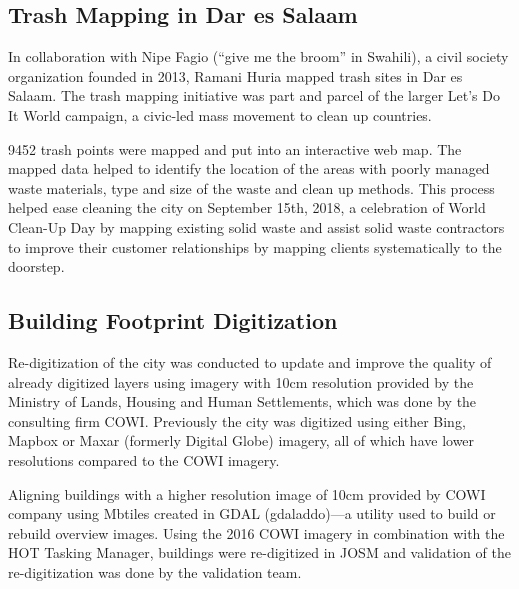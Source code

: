 \documentclass[a4paper,12pt,twoside]{article}
\begin{document}
\subsection{Trash Mapping in Dar es Salaam}
\begin{multicols}{2}
In collaboration with Nipe Fagio (“give me the broom” in Swahili), a civil society organization founded in 2013, Ramani Huria mapped trash sites in Dar es Salaam. The trash mapping initiative was part and parcel of the larger Let’s Do It World campaign, a civic-led mass movement to clean up countries.

9452 trash points were mapped and put into an interactive web map. The mapped data helped to identify the location of the areas with poorly managed waste materials, type and size of the waste and clean up methods. This process helped ease cleaning the city on September 15th, 2018, a celebration of World Clean-Up Day by mapping existing solid waste and assist solid waste contractors to improve their customer relationships by mapping clients systematically to the doorstep.
\end{multicols}

\subsection{Building Footprint Digitization}
\begin{multicols}{2}
Re-digitization of the city was conducted to update and improve the quality of already digitized layers using imagery with 10cm resolution provided by the Ministry of Lands, Housing and Human Settlements, which was done by the consulting firm COWI. Previously the city was digitized using either Bing, Mapbox or Maxar (formerly Digital Globe) imagery, all of which have lower resolutions compared to the COWI imagery.

Aligning buildings with a higher resolution image of 10cm provided by COWI company using Mbtiles created in GDAL (gdaladdo)---a utility used to build or rebuild overview images. Using the 2016 COWI imagery in combination with the HOT Tasking Manager, buildings were re-digitized in JOSM and validation of the re-digitization was done by the validation team.
\end{multicols}
\end{document}
